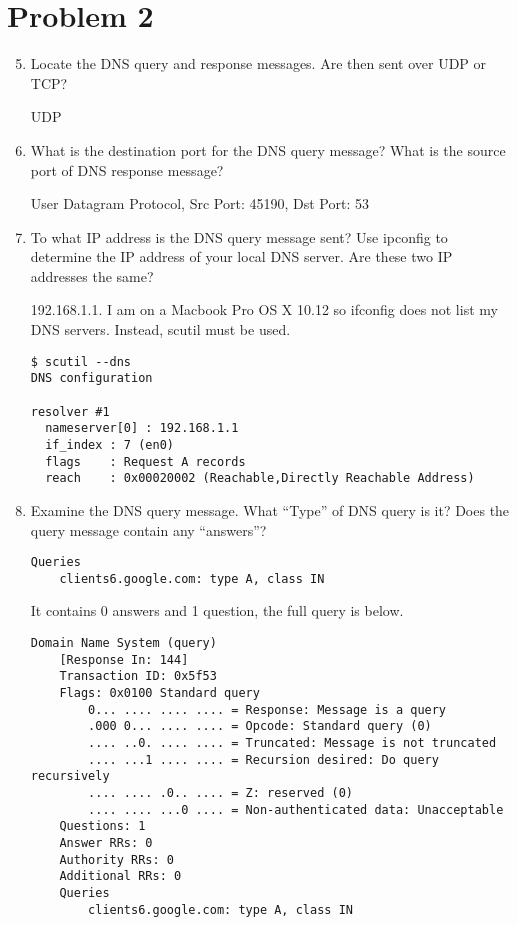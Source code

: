 \documentclass[letter,10pt]{article}
\begin{document}
\section{Problem 2}

\begin{enumerate}
\setcounter{enumi}{4}

\item Locate the DNS query and response messages. Are then sent over UDP or TCP?

UDP

\item What is the destination port for the DNS query message? What is the source port
of DNS response message?

User Datagram Protocol, Src Port: 45190, Dst Port: 53

\item To what IP address is the DNS query message sent? Use ipconfig to determine the
IP address of your local DNS server. Are these two IP addresses the same?

192.168.1.1. I am on a Macbook Pro OS X 10.12 so ifconfig does not list my DNS servers. Instead, scutil must be used.

\begin{verbatim}
$ scutil --dns
DNS configuration

resolver #1
  nameserver[0] : 192.168.1.1
  if_index : 7 (en0)
  flags    : Request A records
  reach    : 0x00020002 (Reachable,Directly Reachable Address)
\end{verbatim}

\item Examine the DNS query message. What “Type” of DNS query is it? Does the
query message contain any “answers”?

\begin{verbatim}
Queries
    clients6.google.com: type A, class IN
\end{verbatim}

It contains 0 answers and 1 question,  the full query is below.

\begin{verbatim}
Domain Name System (query)
    [Response In: 144]
    Transaction ID: 0x5f53
    Flags: 0x0100 Standard query
        0... .... .... .... = Response: Message is a query
        .000 0... .... .... = Opcode: Standard query (0)
        .... ..0. .... .... = Truncated: Message is not truncated
        .... ...1 .... .... = Recursion desired: Do query recursively
        .... .... .0.. .... = Z: reserved (0)
        .... .... ...0 .... = Non-authenticated data: Unacceptable
    Questions: 1
    Answer RRs: 0
    Authority RRs: 0
    Additional RRs: 0
    Queries
        clients6.google.com: type A, class IN
\end{verbatim}


\end{enumerate}
\end{document}
